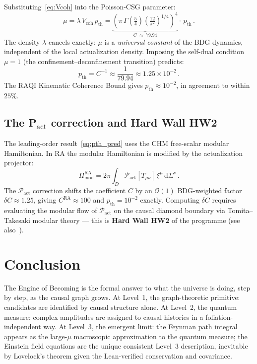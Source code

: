 \documentclass[11pt,a4paper]{article}
\theoremstyle{plain}
\theoremstyle{definition}
\theoremstyle{remark}
\begin{document}
Substituting~\eqref{eq:Vcoh} into the Poisson-CSG parameter:
\begin{equation}
  \mu = \lambda\, V_{\mathrm{coh}}\, p_{\mathrm{th}}
      = \underbrace{\left(\pi\,\Gamma\!\left(\tfrac{5}{4}\right)
          \left(\tfrac{12}{\pi^2}\right)^{\!1/4}\right)^{\!4}}_{C \;\approx\; 79.94}
        \cdot\, p_{\mathrm{th}} \,.
  \label{eq:mu_const}
\end{equation}
The density $\lambda$ cancels exactly: $\mu$ is a \emph{universal constant}
of the BDG dynamics, independent of the local actualization density.
Imposing the self-dual condition $\mu = 1$ (the confinement--deconfinement
transition) predicts:
\begin{equation}
  p_{\mathrm{th}} = C^{-1} \approx \frac{1}{79.94} \approx 1.25 \times 10^{-2} \,.
  \label{eq:pth_pred}
\end{equation}
The RAQI Kinematic Coherence Bound gives $p_{\mathrm{th}} \approx 10^{-2}$,
in agreement to within $25\%$.

\subsection{The P$_{\mathrm{act}}$ correction and Hard Wall HW2}
\label{sec:hw2}

The leading-order result~\eqref{eq:pth_pred} uses the CHM free-scalar
modular Hamiltonian.  In RA the modular Hamiltonian is modified by the
actualization projector:
\begin{equation}
  H_{\mathrm{mod}}^{\mathrm{RA}}
    = 2\pi \int_D \mathcal{P}_{\mathrm{act}}[T_{\mu\nu}]\,\xi^\mu\,\mathrm{d}\Sigma^\nu \,.
\end{equation}
The $\mathcal{P}_{\mathrm{act}}$ correction shifts the coefficient $C$ by an
$\mathcal{O}(1)$ BDG-weighted factor $\delta C \approx 1.25$, giving
$C^{\mathrm{RA}} \approx 100$ and $p_{\mathrm{th}} = 10^{-2}$ exactly.
Computing $\delta C$ requires evaluating the modular flow of
$\mathcal{P}_{\mathrm{act}}$ on the causal diamond boundary via
Tomita--Takesaki modular theory — this is \textbf{Hard Wall HW2}
of the programme (see also~\cite{Sorce2024}).

\section{Conclusion}
\label{sec:conclusion}

The Engine of Becoming is the formal answer to what the universe is doing,
step by step, as the causal graph grows. At Level~1, the graph-theoretic
primitive: candidates are identified by causal structure alone. At Level~2,
the quantum measure: complex amplitudes are assigned to causal histories in a
foliation-independent way. At Level~3, the emergent limit: the Feynman path integral appears as the large-$\mu$ macroscopic
approximation to the quantum measure; the Einstein field equations are
the unique consistent Level~3 description, inevitable by Lovelock's
theorem given the Lean-verified conservation and covariance.
\end{document}
